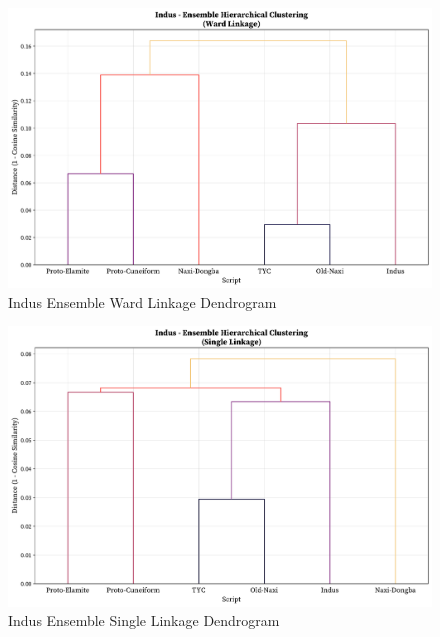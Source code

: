 \documentclass[11pt,a4paper,oneside]{report}
\begin{document}
\begin{figure}[H] 
    \centering
    \includegraphics[width=1\linewidth]{Visualizations/Dendrograms/Indus/ensemble_dendrogram_ward.pdf}
     \caption*{Indus Ensemble Ward Linkage Dendrogram}
\end{figure}

\begin{figure}[H] 
    \centering
    \includegraphics[width=1\linewidth]{Visualizations/Dendrograms/Indus/ensemble_dendrogram_single.pdf}
     \caption*{Indus Ensemble Single Linkage Dendrogram}
\end{figure}
\end{document}
